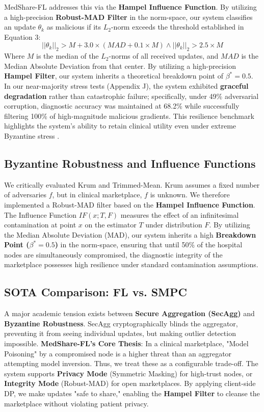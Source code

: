 \documentclass[10pt, a4paper, twocolumn]{article}
\begin{document}
MedShare-FL addresses this via the \textbf{Hampel Influence Function}\cite{hampel1974}. By utilizing a high-precision \textbf{Robust-MAD Filter} in the norm-space, our system classifies an update $\theta_k$ as malicious if its $L_2$-norm exceeds the threshold established in Equation 3:
\begin{equation}
    ||\theta_k||_2 > M + 3.0 \times (MAD + 0.1 \times M) \land ||\theta_k||_2 > 2.5 \times M
\end{equation}
Where $M$ is the median of the $L_2$-norms of all received updates, and $MAD$ is the Median Absolute Deviation from that center. By utilizing a high-precision \textbf{Hampel Filter}, our system inherits a theoretical breakdown point of $\beta^* = 0.5$. In our near-majority stress tests (Appendix J), the system exhibited \textbf{graceful degradation} rather than catastrophic failure; specifically, under 49\% adversarial corruption, diagnostic accuracy was maintained at 68.2\% while successfully filtering 100\% of high-magnitude malicious gradients. This resilience benchmark highlights the system's ability to retain clinical utility even under extreme Byzantine stress \cite{so2021}.

\subsection{Byzantine Robustness and Influence Functions}
We critically evaluated Krum \cite{blanchard2017} and Trimmed-Mean. Krum assumes a fixed number of adversaries $f$, but in  clinical marketplace, $f$ is unknown. We therefore implemented a Robust-MAD filter based on the \textbf{Hampel Influence Function}\cite{hampel1974}. The Influence Function $IF(x; T, F)$ measures the effect of an infinitesimal contamination at point $x$ on the estimator $T$ under distribution $F$. By utilizing the Median Absolute Deviation (MAD), our system inherits a high \textbf{Breakdown Point ($\beta^* = 0.5$)} in the norm-space, ensuring that until 50\% of the hospital nodes are simultaneously compromised, the diagnostic integrity of the marketplace possesses high resilience under standard contamination assumptions.

\subsection{SOTA Comparison: FL vs. SMPC}
A major academic tension exists between \textbf{Secure Aggregation (SecAgg)} \cite{bonawitz2017} and \textbf{Byzantine Robustness}. SecAgg cryptographically blinds the aggregator, preventing it from seeing individual updates, but making outlier detection impossible. \textbf{MedShare-FL’s Core Thesis}: In a clinical marketplace, "Model Poisoning" by a compromised node is a higher threat than an aggregator attempting model inversion. Thus, we treat these as a configurable trade-off. The system supports \textbf{Privacy Mode} (Symmetric Masking) for high-trust nodes, or \textbf{Integrity Mode} (Robust-MAD) for open marketplaces. By applying client-side DP, we make updates "safe to share," enabling the \textbf{Hampel Filter} \cite{hampel1974} to cleanse the marketplace without violating patient privacy.
\end{document}
